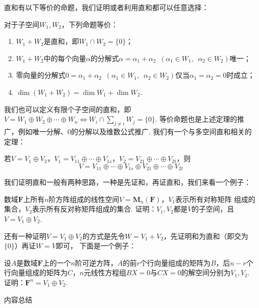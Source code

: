 直和有以下等价的命题，我们证明或者利用直和都可以任意选择：
\begin{theorem}
    对于子空间$W_1,W_2$，下列命题等价：
    \begin{enumerate}[label=(\arabic*)]
        \item $W_1+W_2$是直和，即$W_1 \cap W_2=\{0\}$；

        \item $W_1+W_2$中的每个向量$\alpha$的分解式$\alpha=\alpha_1+\alpha_2\enspace(\alpha_1\in W_1,\enspace\alpha_2\in W_2)$唯一；

        \item 零向量的分解式$0=\alpha_1+\alpha_2 \enspace(\alpha_1\in W_1,\enspace\alpha_2\in W_2)$仅当$\alpha_1=\alpha_2=0$时成立；

        \item $\dim (W_1+W_2)=\dim W_1+\dim W_2$.
    \end{enumerate}
\end{theorem}
我们也可以定义有限个子空间的直和，即$V=W_1\oplus W_2\oplus\cdots\oplus W_n \iff W_i \cap \sum\limits_{j \neq i}W_j=\{0\}$.
等价命题也是上述定理的推广，例如唯一分解、0的分解以及维数公式推广. 我们有一个与多空间直和相关的定理：
\begin{theorem}
    若$V=V_1\oplus V_2$，$V_1=V_{11}\oplus\cdots\oplus V_{1s}$，$V_2=V_{21}\oplus\cdots\oplus V_{2t}$，则
    \[V=V_{11}\oplus\cdots\oplus V_{1s}\oplus V_{21}\oplus\cdots\oplus V_{2t}\]
\end{theorem}
我们证明直和一般有两种思路，一种是先证和，再证直和，我们来看一个例子：
\begin{example}
    数域$\mathbf{F}$上所有$n$阶方阵组成的线性空间$V=\mathbf{M}_n(\mathbf{F})$，$V_1$表示所有对称矩阵
    组成的集合，$V_2$表示所有反对称矩阵组成的集合. 证明：$V_1,V_2$都是$V$的子空间，且$V=V_1\oplus V_2$.
\end{example}
还有一种证明$V=V_1\oplus V_2$的方式是先令$W=V_1+V_2$，先证明和为直和（即交为$\{0\}$）再证$W=V$即可，
下面是一个例子：
\begin{example}
    设$A$是数域$\mathbf{F}$上的一个$n$阶可逆方阵，$A$的前$r$个行向量组成的矩阵为$B$，后$n-r$个
    行向量组成的矩阵为$C$，$n$元线性方程组$BX=0$与$CX=0$的解空间分别为$V_1,V_2$. 证明：$\mathbf{F}^n=V_1\oplus V_2$.
\end{example}

\vspace{2ex}
\centerline{\heiti \Large 内容总结}

\vspace{2ex}

